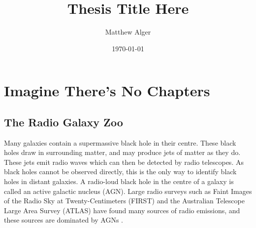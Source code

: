 \documentclass[11pt]{book}
\title{Thesis Title Here}
\author{Matthew Alger}
\date{\today}
\begin{document}
\pagestyle{empty}
\thispagestyle{empty}




\cleardoublepage
\pagestyle{empty}


\cleardoublepage
\pagestyle{empty}


\cleardoublepage
\pagestyle{headings}


\cleardoublepage
\pagestyle{headings}
\tableofcontents

\mainmatter

% 

% 
% 

\chapter{Imagine There's No Chapters}

\section{The Radio Galaxy Zoo}
\label{sec:rgz}

    Many galaxies contain a supermassive black hole in their centre. These black holes draw in surrounding matter, and may produce jets of matter as they do. These jets emit radio waves  which can then be detected by radio telescopes. As black holes cannot be observed directly, this is the only way to identify black holes in distant galaxies. A radio-loud black hole in the centre of a galaxy is called an active galactic nucleus (AGN).  Large radio surveys such as Faint Images of the Radio Sky at Twenty-Centimeters (FIRST) \cite{white97, becker95} and the Australian Telescope Large Area Survey (ATLAS) \cite{franzen15} have found many sources of radio emissions, and these sources are dominated by AGNs \cite{banfield15}.
\end{document}
